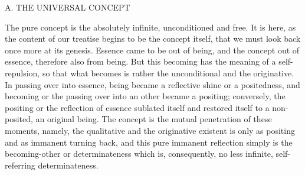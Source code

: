 
A. THE UNIVERSAL CONCEPT

The pure concept is the absolutely
infinite, unconditioned and free.
It is here, as the content of our treatise
begins to be the concept itself,
that we must look back once more at its genesis.
Essence came to be out of being,
and the concept out of essence,
therefore also from being.
But this becoming has the
meaning of a self-repulsion,
so that what becomes is rather
the unconditional and the originative.
In passing over into essence,
being became a reflective shine or a positedness,
and becoming or the passing over into an other
became a positing;
conversely, the positing or the reflection of essence
sublated itself and restored itself to
a non-posited, an original being.
The concept is the mutual penetration of these moments,
namely, the qualitative and the originative existent is
only as positing and as immanent turning back,
and this pure immanent reflection simply is
the becoming-other or determinateness
which is, consequently, no less
infinite, self-referring determinateness.

